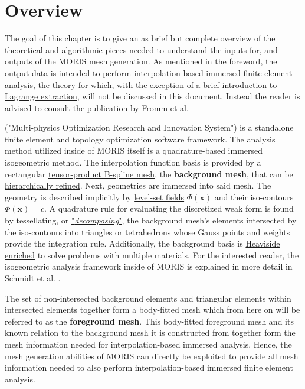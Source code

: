 \chapter{Overview}
\label{sec:overview}

The goal of this chapter is to give an as brief but complete overview of the theoretical and algorithmic pieces needed to understand the inputs for, and outputs of the MORIS mesh generation.
As mentioned in the foreword, the output data is intended to perform interpolation-based immersed finite element analysis, the theory for which, with the exception of a brief introduction to \hyperref[sec:overview_extraction]{Lagrange extraction}, will not be discussed in this document. Instead the reader is advised to consult the publication by Fromm et al. \cite{Fromm2022}

 ("Multi-physics Optimization Research and Innovation System") is a standalone finite element and topology optimization software framework. The analysis method utilized inside of MORIS itself is a quadrature-based immersed isogeometric method. The interpolation function basis is provided by a rectangular \hyperref[sec:overview_background]{tensor-product B-spline mesh}, the \textbf{background mesh}, that can be \hyperlink{hierarchical_refinement}{hierarchically refined}. Next, geometries are immersed into said mesh. The geometry is described implicitly by \hyperref[sec:overview_geometry]{level-set fields} $\Phi(\bm{x})$ and their iso-contours  $\Phi(\bm{x}) = c$. A quadrature rule for evaluating the discretized weak form is found by tessellating, or \hyperlink{decomposition}{"\emph{decomposing}"}, the background mesh's elements intersected by the iso-contours into triangles or tetrahedrons whose Gauss points and weights provide the integration rule. Additionally, the background basis is \hyperlink{enrichment}{Heaviside enriched} to solve problems with multiple materials. For the interested reader, the isogeometric analysis framework inside of MORIS is explained in more detail in Schmidt et al. \cite{Schmidt2022}.

The set of non-intersected background elements and triangular elements within intersected elements together form a body-fitted mesh which from here on will be referred to as the \textbf{foreground mesh}. This body-fitted foreground mesh and its known relation to the background mesh it is constructed from together form the mesh information needed for interpolation-based immersed analysis. Hence, the mesh generation abilities of MORIS can directly be exploited to provide all mesh information needed to also perform interpolation-based immersed finite element analysis.

